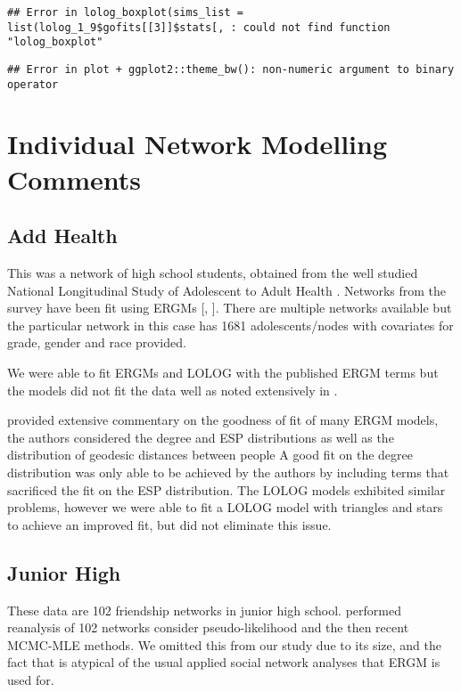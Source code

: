 \documentclass[
]{statsoc}
\begin{document}
\begin{verbatim}
## Error in lolog_boxplot(sims_list = list(lolog_1_9$gofits[[3]]$stats[, : could not find function "lolog_boxplot"
\end{verbatim}

\begin{verbatim}
## Error in plot + ggplot2::theme_bw(): non-numeric argument to binary operator
\end{verbatim}

\section{Individual Network Modelling Comments}\label{app:comments}

\subsection{Add Health}

This was a network of high school students, obtained from the well
studied National Longitudinal Study of Adolescent to Adult Health
\citep{AddHealth2007}. Networks from the survey have been fit using
ERGMs {[}\cite{Goodreau2007}, \cite{Hunter_Goodreau_2008}{]}. There are
multiple networks available but the particular network in this case has
1681 adolescents/nodes with covariates for grade, gender and race
provided.

We were able to fit ERGMs and LOLOG with the published ERGM terms but
the models did not fit the data well as noted extensively in
\cite{Goodreau2007}.

\cite{Goodreau2007} provided extensive commentary on the goodness of fit
of many ERGM models, the authors considered the degree and ESP
distributions as well as the distribution of geodesic distances between
people A good fit on the degree distribution was only able to be
achieved by the authors by including terms that sacrificed the fit on
the ESP distribution. The LOLOG models exhibited similar problems,
however we were able to fit a LOLOG model with triangles and stars to
achieve an improved fit, but did not eliminate this issue.

\subsection{Junior High}

These data are 102 friendship networks in junior high school.
\cite{Lubbers2007} performed reanalysis of 102 networks consider
pseudo-likelihood and the then recent MCMC-MLE methods. We omitted this
from our study due to its size, and the fact that is atypical of the
usual applied social network analyses that ERGM is used for.
\end{document}
